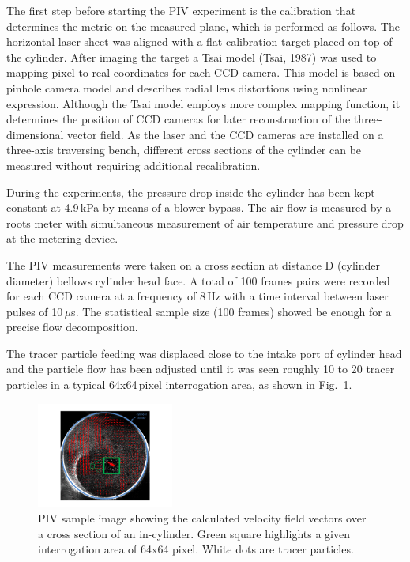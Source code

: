 \documentclass[10pt,fleqn,a4paper]{article}
\begin{document}
The first step before starting the PIV experiment is the calibration that determines the metric on the measured plane, which is performed as follows. The horizontal laser sheet was aligned with a flat calibration target placed on top of the cylinder. After imaging the target a Tsai model (Tsai, 1987) was used to mapping pixel to real coordinates for each CCD camera. This model is based on pinhole camera model and describes radial lens distortions using nonlinear expression. Although the Tsai model employs more complex mapping function, it determines the position of CCD cameras for later reconstruction of the three-dimensional vector field. As the laser and the CCD cameras are installed on a three-axis traversing bench, different cross sections of the cylinder can be measured without requiring additional recalibration.

During the experiments, the pressure drop inside the cylinder has been kept constant at 4.9\,kPa by means of a blower bypass. The air flow is measured by a roots meter with simultaneous measurement of air temperature and pressure drop at the metering device.

The PIV measurements were taken on a cross section at distance D (cylinder diameter) bellows cylinder head face. A total of 100 frames pairs were recorded for each CCD camera at a frequency of 8\,Hz with a time interval between laser pulses of 10\,$\mu$s. The statistical sample size (100 frames) showed be enough for a precise flow decomposition. 

The tracer particle feeding was displaced close to the intake port of cylinder head and the particle flow has been adjusted until it was seen roughly 10 to 20 tracer particles in a typical 64x64\,pixel interrogation area, as shown in Fig.~\ref{fig: densityimage}. 

\begin{figure}[h]
 \centering
 \includegraphics[width=0.4\textwidth]{./imgs/density.pdf}
 \caption{PIV sample image showing the calculated velocity field vectors over a cross section of an in-cylinder. Green square highlights a given interrogation area of 64x64 pixel. White dots are tracer particles.}
 \label{fig: densityimage}
\end{figure}
\end{document}
